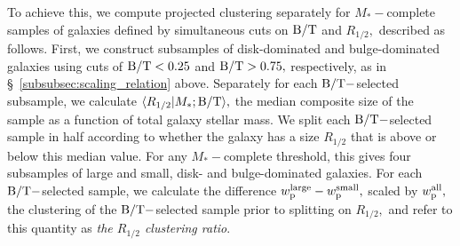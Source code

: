 \documentclass[usenatbib,usegraphicx,letterpaper]{mn2e}
\newcommand{\rhalf}{R_{1/2}}
\newcommand{\bt}{{\rm B/T}}
\newcommand{\mstar}{M_{\ast}}
\newcommand{\wproj}{w_{\rm p}}
\begin{document}
To achieve this, we compute projected clustering separately for $\mstar-$complete samples of galaxies defined by simultaneous cuts on $\bt$ and $\rhalf,$ described as follows. First, we construct subsamples of disk-dominated and bulge-dominated galaxies using cuts of $\bt<0.25$ and $\bt>0.75,$ respectively, as in \S~\ref{subsubsec:scaling_relation} above. Separately for each $\bt-$selected subsample, we calculate $\langle\rhalf\vert\mstar;\bt\rangle,$ the median composite size of the sample as a function of total galaxy stellar mass. We split each $\bt-$selected sample in half according to whether the galaxy has a size $\rhalf$ that is above or below this median value. For any $\mstar-$complete threshold, this gives four subsamples of large and small, disk- and bulge-dominated galaxies. For each $\bt-$selected sample, we calculate the difference $\wproj^{\rm large}-\wproj^{\rm small},$ scaled by $\wproj^{\rm all},$ the clustering of the $\bt-$selected sample prior to splitting on $\rhalf,$ and refer to this quantity as {\em the $\rhalf$ clustering ratio}.
\end{document}
